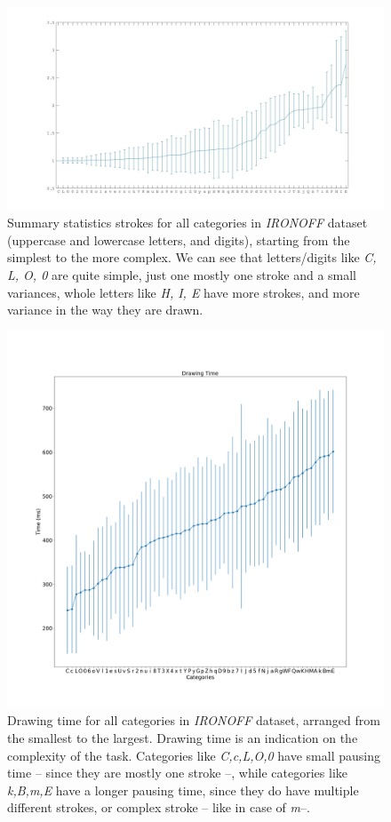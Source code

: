 \begin{figure}
    \centering
    \includegraphics[scale=0.32]{images/dataset/ironoff_strokes.jpg}
    \caption{Summary statistics strokes for all categories in \textit{IRONOFF} dataset (uppercase and lowercase letters, and digits), starting from the simplest to the more complex. We can see that letters/digits like \textit{C, L, O, 0} are quite simple, just one mostly one stroke and a small variances, whole letters like \textit{H, I, E} have more strokes, and more variance in the way they are drawn.}
    \label{fig:ironoff_strokes}
\end{figure}

\begin{figure}
    \centering
    \includegraphics[scale=0.35]{images/dataset/drawing_time.png}
    \caption{Drawing time for all categories in \textit{IRONOFF} dataset, arranged from the smallest to the largest. Drawing time is an indication on the complexity of the task. Categories like \textit{C,c,L,O,0} have small pausing time -- since they are mostly one stroke --, while categories like \textit{k,B,m,E} have a longer pausing time, since they do have multiple different strokes, or complex stroke -- like in case of \textit{m}--.}
    \label{fig:ironoff_drawingtime}
\end{figure}

